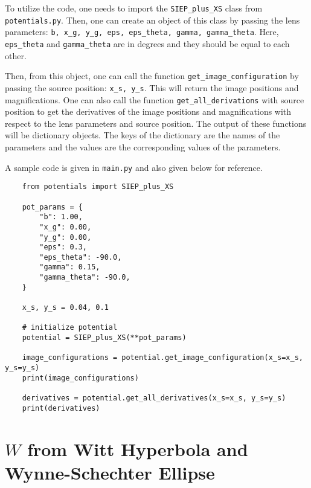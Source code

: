 \documentclass{article}
\begin{document}
To utilize the code, one needs to import the \texttt{SIEP\_plus\_XS} class from \texttt{potentials.py}. Then, one can create an object of this class by passing the lens parameters: \texttt{b, x\_g, y\_g, eps, eps\_theta, gamma, gamma\_theta}. Here, \texttt{eps\_theta} and \texttt{gamma\_theta} are in degrees and they should be equal to each other.

Then, from this object, one can call the function \texttt{get\_image\_configuration} by passing the source position: \texttt{x\_s, y\_s}. This will return the image positions and magnifications. One can also call the function \texttt{get\_all\_derivations} with source position to get the derivatives of the image positions and magnifications with respect to the lens parameters and source position. The output of these functions will be dictionary objects. The keys of the dictionary are the names of the parameters and the values are the corresponding values of the parameters.

A sample code is given in \texttt{main.py} and also given below for reference.
\begin{verbatim}
    from potentials import SIEP_plus_XS

    pot_params = {
        "b": 1.00,
        "x_g": 0.00,
        "y_g": 0.00,
        "eps": 0.3,
        "eps_theta": -90.0,
        "gamma": 0.15,
        "gamma_theta": -90.0,
    }

    x_s, y_s = 0.04, 0.1

    # initialize potential
    potential = SIEP_plus_XS(**pot_params)

    image_configurations = potential.get_image_configuration(x_s=x_s, y_s=y_s)
    print(image_configurations)

    derivatives = potential.get_all_derivatives(x_s=x_s, y_s=y_s)
    print(derivatives)
\end{verbatim}





\section{$W$ from Witt Hyperbola and Wynne-Schechter Ellipse}\label{appsec: WfromHyperbolaAndEllipse}
\end{document}
